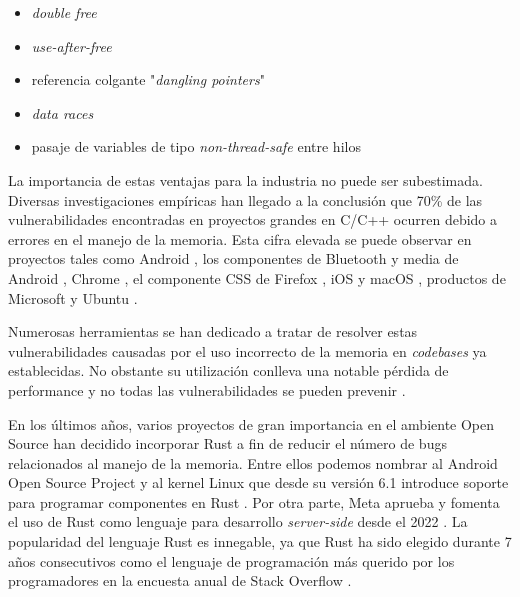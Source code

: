 \documentclass[12pt]{article}
\begin{document}
\begin{itemize}
    \item \textit{double free} \cite[Cap. 4.1]{rust-book}
    \item \textit{use-after-free} \cite[Cap. 4.1]{rust-book}
    \item referencia colgante "\textit{dangling pointers}" \cite[Cap. 4.2]{rust-book}
    \item \textit{data races} \cite[Cap. 4.2]{rust-book}
    \item pasaje de variables de tipo \textit{non-thread-safe} entre hilos \cite[Cap. 16.4]{rust-book}
\end{itemize}

La importancia de estas ventajas para la industria no puede ser subestimada.
Diversas investigaciones empíricas han llegado a la conclusión que 70\% de las vulnerabilidades
encontradas en proyectos grandes en C/C++ ocurren debido a errores en el manejo de la memoria.
Esta cifra elevada se puede observar en proyectos tales como Android \cite{memory-bugs-android},
los componentes de Bluetooth y media de Android \cite{memory-bugs-android-media-bluetooth},
Chrome \cite{memory-bugs-chrome}, el componente CSS de Firefox \cite{memory-bugs-firefox},
iOS y macOS \cite{memory-bugs-ios-macos}, productos de Microsoft \cite{miller-security-microsoft2019, memory-bugs-microsoft}
y Ubuntu \cite{memory-bugs-ubuntu}.

Numerosas herramientas se han dedicado a tratar de resolver estas vulnerabilidades causadas por el uso incorrecto de la memoria en \textit{codebases} ya establecidas.
No obstante su utilización conlleva una notable pérdida de performance y no todas las vulnerabilidades se pueden prevenir \cite{szekeres2013}.

En los últimos años, varios proyectos de gran importancia en el ambiente Open Source han decidido incorporar Rust
a fin de reducir el número de bugs relacionados al manejo de la memoria.
Entre ellos podemos nombrar al Android Open Source Project \cite{android-rust} y
al kernel Linux que desde su versión 6.1 introduce soporte para programar componentes en Rust \cite{infoq-linux-6.1-rust, lwn-linux-6.1-rust}.
Por otra parte, Meta aprueba y fomenta el uso de Rust como lenguaje para desarrollo \textit{server-side} desde el 2022 \cite{meta-rust-server-side}.
La popularidad del lenguaje Rust es innegable, ya que Rust ha sido elegido durante 7 años consecutivos
como el lenguaje de programación más querido por los programadores en la encuesta anual de Stack Overflow \cite{so-survey2022}.
\end{document}
